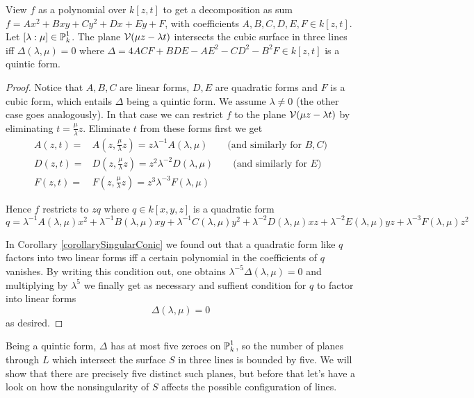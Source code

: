 \begin{lemma} \label{lemmaDelta}
View $f$ as a polynomial over $k[z,t]$ to get a decomposition as sum $f = Ax^2 + Bxy + Cy^2 + Dx + Ey + F$, with coefficients $A,B,C,D,E,F \in k[z,t]$.
Let $[\lambda:\mu] \in \operatorname{\mathbb P}^1_k$.
The plane $\operatorname{\mathcal V}(\mu z - \lambda t)$ intersects the cubic surface in three lines iff
$\Delta(\lambda,\mu) = 0$ where $\Delta = 4ACF + BDE - AE^2 - CD^2 - B^2F \in k[z,t]$ is a quintic form.
\end{lemma}

\begin{proof}
Notice that $A,B,C$ are linear forms, $D,E$ are quadratic forms and $F$ is a cubic form, which entails $\Delta$ being a quintic form.
We assume $\lambda \neq 0$ (the other case goes analogously).
In that case we can restrict $f$ to the plane $\operatorname{\mathcal V}(\mu z - \lambda t)$ by eliminating $t = \frac\mu\lambda z$.
Eliminate $t$ from these forms first we get
\begin{align}
A(z,t) =& A(z,\frac\mu\lambda z) = z\lambda^{-1} A(\lambda,\mu) \qquad \text{(and similarly for $B,C$)} \\
D(z,t) =& D(z,\frac\mu\lambda z) = z^2\lambda^{-2} D(\lambda,\mu) \qquad \text{(and similarly for $E$)} \\
F(z,t) =& F(z,\frac\mu\lambda z) = z^3\lambda^{-3} F(\lambda,\mu)
\end{align}

Hence $f$ restricts to $zq$ where $q \in k[x,y,z]$ is a quadratic form
\begin{equation}
q =
\lambda^{-1} A(\lambda,\mu) x^2
+\lambda^{-1} B(\lambda,\mu) xy
+\lambda^{-1} C(\lambda,\mu) y^2
+\lambda^{-2} D(\lambda,\mu) xz
+\lambda^{-2} E(\lambda,\mu) yz
+\lambda^{-3} F(\lambda,\mu) z^2
\end{equation}

In Corollary \ref{corollarySingularConic} we found out that a quadratic form like $q$ factors into two linear forms iff a certain polynomial in the coefficients of $q$ vanishes.
By writing this condition out, one obtains $\lambda^{-5} \Delta(\lambda,\mu) = 0$ and multiplying by $\lambda^5$ we finally get as necessary and suffient condition for $q$ to factor into linear forms
\begin{equation}
\Delta(\lambda,\mu) = 0
\end{equation}
as desired.
\end{proof}

Being a quintic form, $\Delta$ has at most five zeroes on $\operatorname{\mathbb P}^1_k$, so the number of planes through $L$ which intersect the surface $S$ in three lines is bounded by five.
We will show that there are precisely five distinct such planes, but before that let's have a look on how the nonsingularity of $S$ affects the possible configuration of lines.

